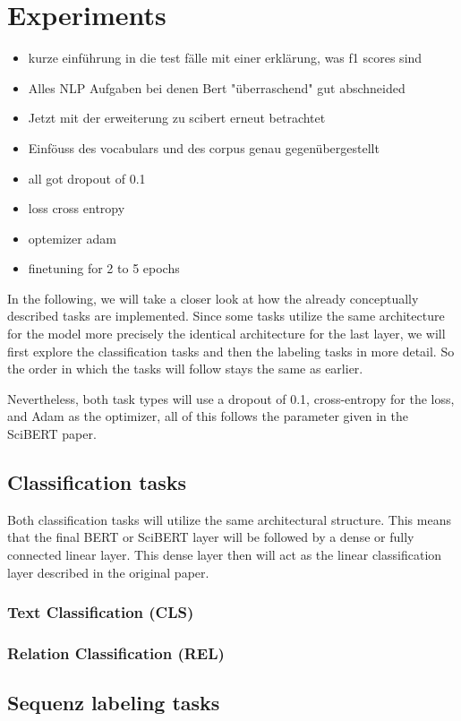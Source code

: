 \chapter{Experiments}
\begin{itemize}
	\item kurze einführung in die test fälle mit einer erklärung, was f1 scores sind
	\item Alles NLP Aufgaben bei denen Bert "überraschend" gut abschneided
	\item Jetzt mit der erweiterung zu scibert erneut betrachtet
	\item Einföuss des vocabulars und des corpus genau gegenübergestellt
	\item all got dropout of 0.1
	\item loss cross entropy
	\item optemizer adam
	\item finetuning for 2 to 5 epochs 
\end{itemize}
In the following, we will take a closer look at how the already conceptually described tasks are implemented. Since some tasks utilize the same architecture for the model more precisely the identical architecture for the last layer, we will first explore the classification tasks and then the labeling tasks in more detail. So the order in which the tasks will follow stays the same as earlier.

Nevertheless, both task types will use a dropout of 0.1, cross-entropy for the loss, and Adam as the optimizer, all of this follows the parameter given in the SciBERT paper.

\section{Classification tasks}
Both classification tasks will utilize the same architectural structure. This means that the final BERT or SciBERT layer will be followed by a dense or fully connected linear layer. This dense layer then will act as the linear classification layer described in the original paper. 
\subsection{Text Classification (CLS)}
\subsection{Relation Classification (REL)}
\section{Sequenz labeling tasks}
